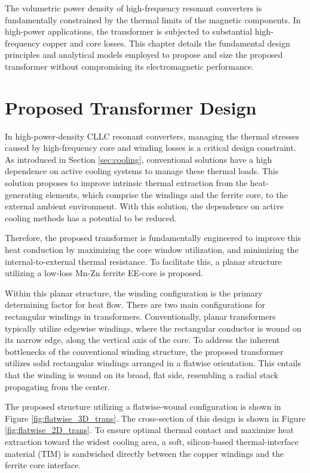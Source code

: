 The volumetric power density of high-frequency resonant converters is fundamentally constrained by the thermal limits of the magnetic components. In high-power applications, the transformer is subjected to substantial high-frequency copper and core losses. This chapter details the fundamental design principles and analytical models employed to propose and size the proposed transformer without compromising its electromagnetic performance.

\section{Proposed Transformer Design}
In high-power-density CLLC resonant converters, managing the thermal stresses caused by high-frequency core and winding losses is a critical design constraint. As introduced in Section \ref{sec:cooling}, conventional solutions have a high dependence on active cooling systems to manage these thermal loads. This solution proposes to improve intrinsic thermal extraction from the heat-generating elements, which comprise the windings and the ferrite core, to the external ambient environment. With this solution, the dependence on active cooling methods has a potential to be reduced. 

Therefore, the proposed transformer is fundamentally engineered to improve this heat conduction by maximizing the core window utilization, and minimizing the internal-to-external thermal resistance. To facilitate this, a planar structure utilizing a low-loss Mn-Zn ferrite EE-core is proposed. 

Within this planar structure, the winding configuration is the primary determining factor for heat flow. There are two main configurations for rectangular windings in transformers. Conventionally, planar transformers typically utilize edgewise windings, where the rectangular conductor is wound on its narrow edge, along the vertical axis of the core. To address the inherent bottlenecks of the conventional winding structure, the proposed transformer utilizes solid rectangular windings arranged in a flatwise orientation. This entails that the winding is wound on its broad, flat side, resembling a radial stack propagating from the center.

The proposed structure utilizing a flatwise-wound configuration is shown in Figure \ref{fig:flatwise_3D_trans}. The cross-section of this design is shown in Figure \ref{fig:flatwise_2D_trans}. To ensure optimal thermal contact and maximize heat extraction toward the widest cooling area, a soft, silicon-based thermal-interface material (TIM) is sandwiched directly between the copper windings and the ferrite core interface.

